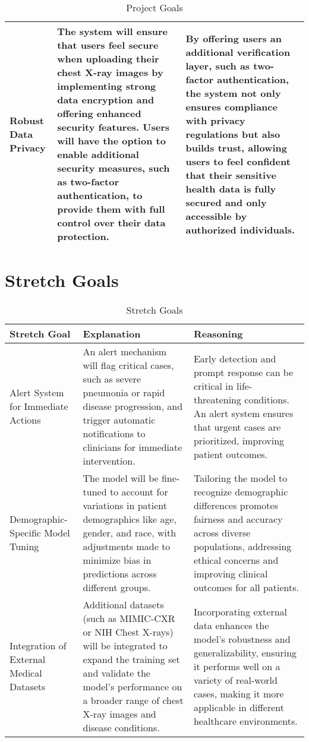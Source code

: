\documentclass{article}
\begin{document}
\begin{table}[H]
\begin{tabular}{|p{3cm}|p{6cm}|p{6cm}|}
    Robust Data Privacy  & The system will ensure that users feel secure when uploading their chest X-ray images by implementing strong data encryption and offering enhanced security features. Users will have the option to enable additional security measures, such as two-factor authentication, to provide them with full control over their data protection. & By offering users an additional verification layer, such as two-factor authentication, the system not only ensures compliance with privacy regulations but also builds trust, allowing users to feel confident that their sensitive health data is fully secured and only accessible by authorized individuals. \\ \hline
    \end{tabular}
    \caption{Project Goals}
\end{table}
\section{Stretch Goals}
\begin{table}[ht]
    \hspace*{-2cm}
    \centering
    \begin{tabular}{|p{3cm}|p{6cm}|p{6cm}|}
    \hline
    \textbf{Stretch Goal} & \textbf{Explanation} & \textbf{Reasoning} \\ \hline

    Alert System for Immediate Actions & An alert mechanism will flag critical cases, such as severe pneumonia or rapid disease progression, and trigger automatic notifications to clinicians for immediate intervention. & Early detection and prompt response can be critical in life-threatening conditions. An alert system ensures that urgent cases are prioritized, improving patient outcomes. \\ \hline

    Demographic-Specific Model Tuning & The model will be fine-tuned to account for variations in patient demographics like age, gender, and race, with adjustments made to minimize bias in predictions across different groups. & Tailoring the model to recognize demographic differences promotes fairness and accuracy across diverse populations, addressing ethical concerns and improving clinical outcomes for all patients. \\ \hline

    Integration of External Medical Datasets & Additional datasets (such as MIMIC-CXR or NIH Chest X-rays) will be integrated to expand the training set and validate the model’s performance on a broader range of chest X-ray images and disease conditions. & Incorporating external data enhances the model’s robustness and generalizability, ensuring it performs well on a variety of real-world cases, making it more applicable in different healthcare environments. \\ \hline

    \end{tabular}
    \caption{Stretch Goals}
\end{table}
\end{document}
